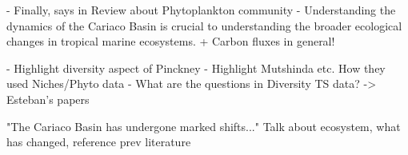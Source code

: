 \documentclass[draft]{agujournal2019}
\begin{document}
    
    - Finally, says in Review about Phytoplankton community
    - Understanding the dynamics of the Cariaco Basin is crucial to understanding the broader ecological changes in tropical marine ecosystems. + Carbon fluxes in general!

    - Highlight diversity aspect of Pinckney
    - Highlight Mutshinda etc. How they used Niches/Phyto data
    - What are the questions in Diversity TS data? -> Esteban's papers
   



    
    
    "The Cariaco Basin has undergone marked shifts..." Talk about ecosystem, what has changed, reference prev literature
\end{document}
